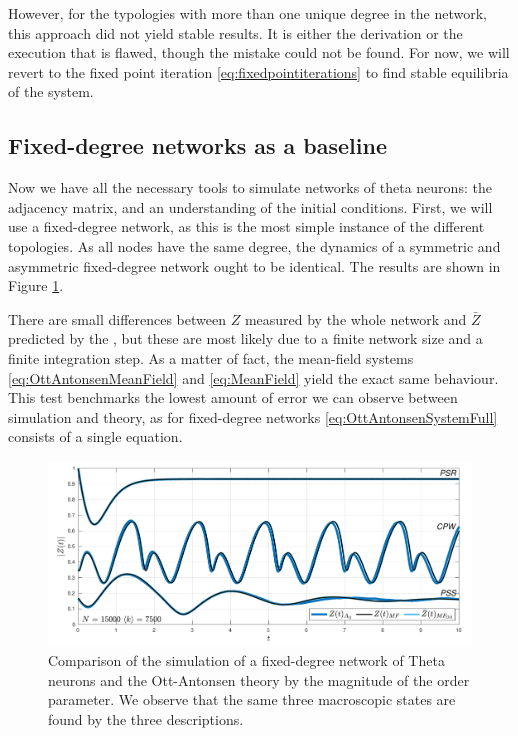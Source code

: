 However, for the typologies with more than one unique degree in the network, this approach did not yield stable results. It is either the derivation or the execution that is flawed, though the mistake could not be found. For now, we will revert to the fixed point iteration \eqref{eq:fixedpointiterations} to find stable equilibria of the system.



\subsection{Fixed-degree networks as a baseline}
Now we have all the necessary tools to simulate networks of theta neurons: the adjacency matrix, and an understanding of the initial conditions. First, we will use a fixed-degree network, as this is the most simple instance of the different topologies. As all nodes have the same degree, the dynamics of a symmetric and asymmetric fixed-degree network ought to be identical. The results are shown in Figure \ref{fig:InspectMeanFieldFixedDegree}.

There are small differences between $Z$ measured by the whole network and $\bar{Z}$ predicted by the \MFR, but these are most likely due to a finite network size and a finite integration step. As a matter of fact, the mean-field systems \eqref{eq:OttAntonsenMeanField} and \eqref{eq:MeanField} yield the exact same behaviour. This test benchmarks the lowest amount of error we can observe between simulation and theory, as for fixed-degree networks \eqref{eq:OttAntonsenSystemFull} consists of a single equation.
\begin{figure}[H]
\centering
\includegraphics[width = \textwidth, trim={0 3mm 0 3mm},clip]{../Figures/InspectMeanFieldFixedDegree.pdf}
\caption{Comparison of the simulation of a fixed-degree network of Theta neurons and the Ott-Antonsen theory by the magnitude of the order parameter. We observe that the same three macroscopic states are found by the three descriptions.}
\label{fig:InspectMeanFieldFixedDegree}
\end{figure}


